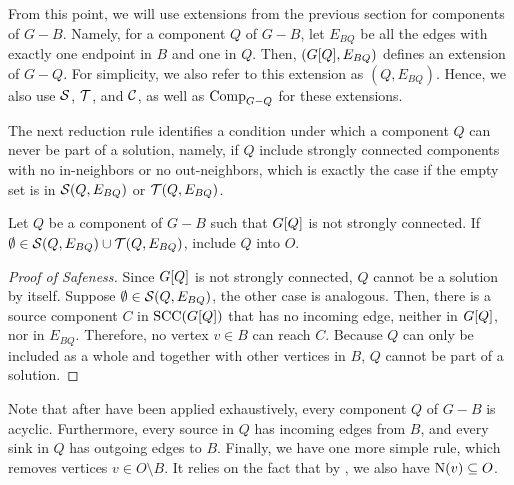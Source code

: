 \begin{theorem}
\begin{lemma}
\begin{theorem}
\begin{lemma}
\begin{reduction*}


From this point, we will use extensions from the previous section for components of $G-B$. Namely, for a component $Q$ of $G-B$, let $E_{BQ}$ be all the edges with exactly one endpoint in $B$ and one in $Q$. Then, $({G}[{Q}], E_{BQ})$ defines an extension of $G-Q$. For simplicity, we also refer to this extension as $(Q, E_{BQ})$. Hence, we also use $\operatorname{\mathcal{S}}$, $\operatorname{\mathcal{T}}$, and $\operatorname{\mathcal{C}}$, as well as $\operatorname{\textrm{Comp}}_{G-Q}$ for these extensions. 

The next reduction rule identifies a condition under which a component $Q$ can never be part of a solution, namely, if $Q$ include strongly connected components with no in-neighbors or no out-neighbors, which is exactly the case if the empty set is in $\operatorname{\mathcal{S}}({Q,E_{BQ}})$ or $\operatorname{\mathcal{T}}({Q,E_{BQ}})$.

\iflong
\begin{reduction*}
\else
\begin{reduction*}[$\star$]
\fi
\label{red:scc_no_sources_or_sinks}
  Let $Q$ be a component of $G - B$ such that ${G}[{Q}]$ is not strongly connected. If $\emptyset \in \operatorname{\mathcal{S}}({Q,E_{BQ}}) \cup \operatorname{\mathcal{T}}({Q,E_{BQ}})$, include $Q$ into $O$. 
\end{reduction*}
\iflong
\begin{proof}[Proof of Safeness]
    Since ${G}[{Q}]$ is not strongly connected, $Q$ cannot be a solution by itself. Suppose $\emptyset \in \operatorname{\mathcal{S}}({Q,E_{BQ}})$, the other case is analogous. Then, there is a source component $C$ in $\operatorname{\textrm{SCC}}({{G}[{Q}]})$ that has no incoming edge, neither in ${G}[{Q}]$, nor in $E_{BQ}$. 
    Therefore, no vertex $v \in B$ can reach $C$.
    Because $Q$ can only be included as a whole and together with other vertices in $B$, $Q$ cannot be part of a solution.
\end{proof}
\fi

Note that after  have been applied exhaustively, every component $Q$ of $G - B$ is acyclic. Furthermore, every source in $Q$ has incoming edges from $B$, and every sink in $Q$ has outgoing edges to $B$. Finally, we have one more simple rule, which removes vertices $v \in O \setminus B$. It relies on the fact that by , we also have $\operatorname{N}({v}) \subseteq O$.


\end{reduction*}
\end{reduction*}
\end{lemma}
\end{theorem}
\end{lemma}
\end{theorem}
